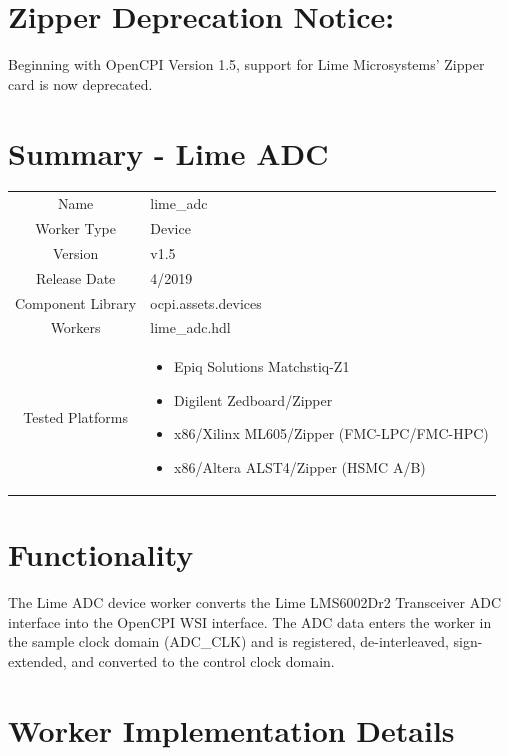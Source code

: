 \documentclass{article}
\author{} %
\date{Version \docVersion} %
\title{\docTitle}
\def\docVersion{1.5}
\def\comp{lime\_adc}
\def\Comp{Lime ADC}
\begin{document}
\section*{Zipper Deprecation Notice:}
Beginning with OpenCPI Version 1.5, support for Lime Microsystems' Zipper card is now deprecated.
\section*{Summary - \Comp}
\begin{tabular}{|c|M{13.5cm}|}
	\hline
	                  &                  \\
	\hline
	Name              & \comp            \\
	\hline
	Worker Type       & Device           \\
	\hline
	Version           & v\docVersion \\
	\hline
	Release Date      & 4/2019 \\
	\hline
	Component Library & ocpi.assets.devices     \\
	\hline
	Workers           & \comp.hdl        \\
	\hline
	Tested Platforms  &
\begin{itemize}
  \item Epiq Solutions Matchstiq-Z1
  \item Digilent Zedboard/Zipper
  \item x86/Xilinx ML605/Zipper (FMC-LPC/FMC-HPC)
  \item x86/Altera ALST4/Zipper (HSMC A/B)
\end{itemize} \\
	\hline
\end{tabular}

\section*{Functionality}
\begin{flushleft}
	The Lime ADC device worker converts the Lime LMS6002Dr2 Transceiver ADC interface into the OpenCPI WSI interface. The ADC data enters the worker in the sample clock domain (ADC\_CLK) and is registered, de-interleaved, sign-extended, and converted to the control clock domain.
\end{flushleft}

\section*{Worker Implementation Details}
\end{document}
